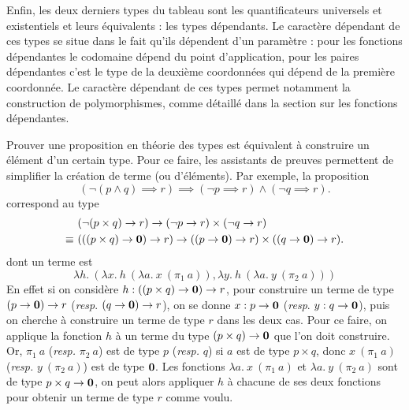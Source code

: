 \documentclass[../../rapport.tex]{subfiles}
\begin{document}
  Enfin, les deux derniers types du tableau sont les quantificateurs universels et existentiels et leurs équivalents : les types dépendants.
  Le caractère dépendant de ces types se situe dans le fait qu'ils dépendent d'un paramètre :
  pour les fonctions dépendantes le codomaine dépend du point d'application,
  pour les paires dépendantes c'est le type de la deuxième coordonnées qui dépend de la première coordonnée.
  Le caractère dépendant de ces types permet notamment la construction de polymorphismes,
  comme détaillé dans la section sur les fonctions dépendantes.


  \vspace{1em}
  Prouver une proposition en théorie des types est équivalent à construire un élément d'un certain type.
  Pour ce faire, les assistants de preuves permettent de simplifier la création de terme (ou d'éléments).
  Par exemple, la proposition
  $$(\neg (p \wedge q) \implies r) \implies (\neg p \implies r) \wedge (\neg q \implies r).$$
  correspond au type
  \begin{align*}
    &(\neg (p \times q) \rightarrow r) \rightarrow (\neg p \rightarrow r) \times (\neg q \rightarrow r) \\
    \equiv\ &(((p \times q) \rightarrow \operatorname{\textbf{0}}) \rightarrow r) \rightarrow ((p \rightarrow \operatorname{\textbf{0}}) \rightarrow r) \times ((q \rightarrow \operatorname{\textbf{0}}) \rightarrow r).
  \end{align*}
  dont un terme est
  $$
  \lambda h.\ (\lambda x.\ h\ (\lambda a.\ x\ (\pi_1\ a)), \lambda y.\ h\ (\lambda a.\ y\ (\pi_2\ a)))
  $$
  En effet si on considère $h : ((p \times q) \rightarrow \operatorname{\textbf{0}}) \rightarrow r$,
  pour construire un terme de type $(p \rightarrow \operatorname{\textbf{0}}) \rightarrow r$ (\textit{resp}. $(q \rightarrow \operatorname{\textbf{0}}) \rightarrow r$),
  on se donne $x : p \rightarrow \operatorname{\textbf{0}}$ (\textit{resp}. $y : q \rightarrow \operatorname{\textbf{0}}$),
  puis on cherche à construire un terme de type $r$ dans les deux cas.
  Pour ce faire, on applique la fonction $h$ à un terme du type $(p \times q) \rightarrow \operatorname{\textbf{0}}$ que l'on doit construire.
  Or, $\pi_1\ a$ (\textit{resp.} $\pi_2\ a$) est de type $p$ (\textit{resp.} $q$) si $a$ est de type $p \times q$,
  donc $x\ (\pi_1\ a)$ (\textit{resp.} $y\ (\pi_2\ a)$) est de type $\operatorname{\textbf{0}}$.
  Les fonctions $\lambda a.\ x\ (\pi_1\ a)$ et $\lambda a.\ y\ (\pi_2\ a)$ sont de type $p \times q \rightarrow \operatorname{\textbf{0}}$,
  on peut alors appliquer $h$ à chacune de ses deux fonctions pour obtenir un terme de type $r$ comme voulu.
\end{document}
